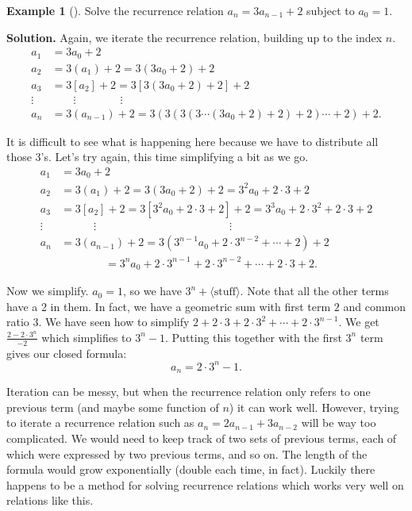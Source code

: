 \documentclass[10pt,]{book}
\theoremstyle{plain}
\theoremstyle{definition}
\theoremstyle{definition}
\newtheorem{example}[theorem]{Example}
\theoremstyle{definition}
\theoremstyle{definition}
\numberwithin{equation}{chapter}
\newcommand{\amp}{&}
\begin{document}
\begin{example}[]\label{example-22}
\hypertarget{p-319}{}%
Solve the recurrence relation \(a_n = 3a_{n-1} + 2\) subject to \(a_0 = 1\).%
\par\smallskip%
\noindent\textbf{Solution.}\hypertarget{solution-36}{}\quad%
\hypertarget{p-320}{}%
Again, we iterate the recurrence relation, building up to the index \(n\).%
\begin{align*}
a_1 \amp = 3a_0 + 2\\
a_2 \amp = 3(a_1) + 2 = 3(3a_0 + 2) + 2\\
a_3 \amp = 3[a_2] + 2 = 3[3(3a_0 + 2) + 2] + 2\\
\vdots \amp \qquad \vdots \qquad \qquad \vdots\\
a_n \amp = 3(a_{n-1}) + 2 = 3(3(3(3\cdots(3a_0 + 2) + 2) + 2)\cdots + 2)+ 2.
\end{align*}
%
\par
\hypertarget{p-321}{}%
It is difficult to see what is happening here because we have to distribute all those 3's. Let's try again, this time simplifying a bit as we go.%
\begin{align*}
a_1 \amp = 3a_0 + 2\\
a_2 \amp = 3(a_1) + 2 = 3(3a_0 + 2) + 2 = 3^2a_0 + 2\cdot 3 + 2\\
a_3 \amp = 3[a_2] + 2 = 3[3^2a_0 + 2\cdot 3 + 2] + 2 = 3^3 a_0 + 2 \cdot 3^2 + 2 \cdot 3 + 2\\
\vdots \amp \qquad\quad \vdots \hspace{2in} \vdots\\
a_n \amp = 3(a_{n-1}) + 2 = 3(3^{n-1}a_0 + 2 \cdot 3^{n-2} + \cdots +2)+ 2\\
\amp \qquad \qquad = 3^n a_0 + 2\cdot 3^{n-1} + 2 \cdot 3^{n-2} + \cdots + 2\cdot 3 + 2.
\end{align*}
%
\par
\hypertarget{p-322}{}%
Now we simplify. \(a_0 = 1\), so we have \(3^n + \langle\text{stuff}\rangle\). Note that all the other terms have a 2 in them. In fact, we have a geometric sum with first term \(2\) and common ratio \(3\). We have seen how to simplify \(2 + 2\cdot 3 + 2 \cdot 3^2 + \cdots + 2\cdot 3^{n-1}\). We get \(\frac{2-2\cdot 3^n}{-2}\) which simplifies to \(3^n - 1\). Putting this together with the first \(3^n\) term gives our closed formula:%
\begin{equation*}
a_n = 2\cdot 3^n - 1.
\end{equation*}
%
\end{example}
\hypertarget{p-323}{}%
Iteration can be messy, but when the recurrence relation only refers to one previous term (and maybe some function of \(n\)) it can work well. However, trying to iterate a recurrence relation such as \(a_n = 2 a_{n-1} + 3 a_{n-2}\) will be way too complicated. We would need to keep track of two sets of previous terms, each of which were expressed by two previous terms, and so on. The length of the formula would grow exponentially (double each time, in fact). Luckily there happens to be a method for solving recurrence relations which works very well on relations like this.%
\typeout{************************************************}
\typeout{************************************************}
\end{document}

